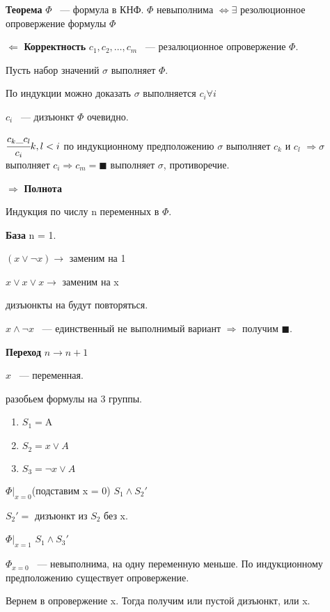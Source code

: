 \documentclass[12pt]{article}
\begin{document}
\begin{description}
\item{\bf Теорема} $\Phi$ ~--- формула в КНФ. $\Phi$ невыполнима $\Leftrightarrow \exists$ резолюционное опровержение формулы $\Phi$
\item {$\Leftarrow$ \bf Корректность} $c_1, c_2, \ldots, c_m$ ~--- резалюционное опровержение $\Phi$.

Пусть набор значений $\sigma$ выполняет $\Phi$.

По индукции можно доказать $\sigma$ выполняется $c_i \forall i$

$c_i$ ~--- дизъюнкт $\Phi$ очевидно.

$\cfrac{c_k\_c_l}{c_i} k, l < i$ по индукционному предположению $\sigma$ выполняет $c_k$ и $c_l$ $\Rightarrow \sigma$ выполняет $c_i \Rightarrow c_m = \blacksquare$ выполняет $\sigma$, противоречие. 

\item {$\Rightarrow$ \bf Полнота}

Индукция по числу n переменных в $\Phi$.

{\bf База} n = 1.

$(x \vee \neg x) \to $ заменим на 1

$x \vee x \vee x \to$ заменим на x

дизъюнкты на будут повторяться. 

$x \wedge \neg x$ ~--- единственный не выполнимый вариант $\Rightarrow$  получим $\blacksquare$.

{\bf Переход} $n \to n + 1$

$x$ ~--- переменная.

разобьем формулы на 3 группы. 

\begin{enumerate}
\item $S_1 = $A
\item $S _2 = x \vee A$
\item $S_3 = \neg x \vee A$
\end{enumerate}

$\Phi|_{x = 0}$(подставим x = 0) $S_1 \wedge S_2'$

$S_2' = $ дизъюнкт из $S_2$ без x.


$\Phi|_{x = 1}$ $S_1 \wedge S_3'$

$\Phi_{x = 0}$ ~--- невыполнима, на одну переменную меньше. По индукционному предположению существует опровержение. 

Вернем в опровержение x. Тогда получим или пустой  дизъюнкт, или x. 


\end{description}
\end{document}
